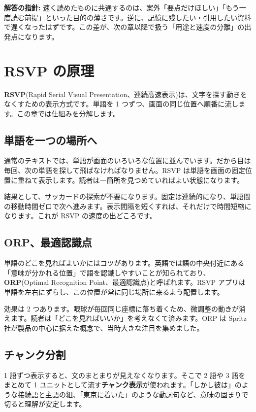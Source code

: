 \documentclass{article}
\begin{document}
\textbf{解答の指針:} 速く読めたものに共通するのは、案外「要点だけほしい」「もう一度読む前提」といった目的の薄さです。逆に、記憶に残したい・引用したい資料で遅くなったはずです。この差が、次の章以降で扱う「用途と速度の分離」の出発点になります。

\section{RSVP の原理}

\textbf{RSVP}(Rapid Serial Visual Presentation、連続高速表示)は、文字を探す動きをなくすための表示方式です。単語を 1 つずつ、画面の同じ位置へ順番に流します。この章では仕組みを分解します。

\subsection{単語を一つの場所へ}

通常のテキストでは、単語が画面のいろいろな位置に並んでいます。だから目は毎回、次の単語を探して飛ばなければなりません。RSVP は単語を画面の固定位置に重ねて表示します。読者は一箇所を見つめていればよい状態になります。

結果として、サッカードの探索が不要になります。固定は連続的になり、単語間の移動時間ゼロで次へ進みます。表示間隔を短くすれば、それだけで時間短縮になります。これが RSVP の速度の出どころです。

\subsection{ORP、最適認識点}

単語のどこを見ればよいかにはコツがあります。英語では語の中央付近にある「意味が分かれる位置」で語を認識しやすいことが知られており、\textbf{ORP}(Optimal Recognition Point、最適認識点)と呼ばれます。RSVP アプリは単語を左右にずらし、この位置が常に同じ場所に来るよう配置します。

効果は 2 つあります。眼球が毎回同じ座標に落ち着くため、微調整の動きが消えます。読者は「どこを見ればいいか」を考えなくて済みます。ORP は Spritz 社が製品の中心に据えた概念で、当時大きな注目を集めました。

\subsection{チャンク分割}

1 語ずつ表示すると、文のまとまりが見えなくなります。そこで 2 語や 3 語をまとめて 1 ユニットとして流す\textbf{チャンク表示}が使われます。「しかし彼は」のような接続語と主語の組、「東京に着いた」のような動詞句など、意味の固まりで切ると理解が安定します。
\end{document}
